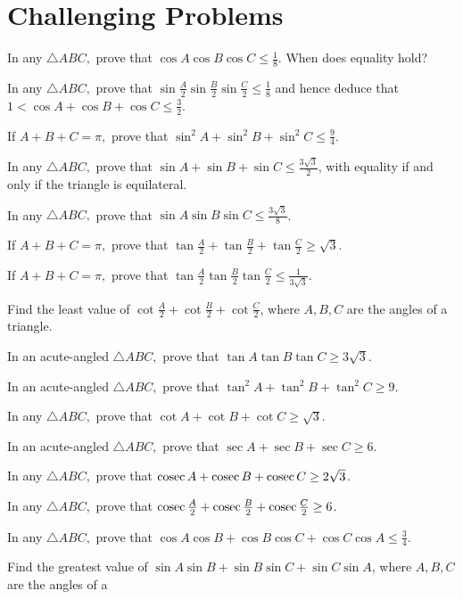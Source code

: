 \section{Challenging Problems}
\startitemize[n, 1*broad]
\item In any $\triangle ABC,$ prove that $\cos A\cos B\cos C \leq \frac{1}{8}$. When does equality hold?
\item In any $\triangle ABC,$ prove that $\sin\frac{A}{2}\sin\frac{B}{2}\sin\frac{C}{2} \leq \frac{1}{8}$ and hence
  deduce that $1 < \cos A + \cos B + \cos C \leq \frac{3}{2}$.
\item If $A + B + C = \pi,$ prove that $\sin^2A + \sin^2B + \sin^2C \leq \frac{9}{4}$.
\item In any $\triangle ABC,$ prove that $\sin A + \sin B + \sin C \leq \frac{3\sqrt{3}}{2}$, with equality if and only
  if the triangle is equilateral.
\item In any $\triangle ABC,$ prove that $\sin A\sin B\sin C \leq \frac{3\sqrt{3}}{8}$.
\item If $A + B + C = \pi,$ prove that $\tan\frac{A}{2} + \tan\frac{B}{2} + \tan\frac{C}{2} \geq \sqrt{3}$.
\item If $A + B + C = \pi,$ prove that $\tan\frac{A}{2}\tan\frac{B}{2}\tan\frac{C}{2} \leq \frac{1}{3\sqrt{3}}$.
\item Find the least value of $\cot\frac{A}{2} + \cot\frac{B}{2} + \cot\frac{C}{2}$, where $A, B, C$ are the angles of a
  triangle.
\item In an acute-angled $\triangle ABC,$ prove that $\tan A\tan B\tan C \geq 3\sqrt{3}$.
\item In an acute-angled $\triangle ABC,$ prove that $\tan^2A + \tan^2B + \tan^2C \geq 9$.
\item In any $\triangle ABC,$ prove that $\cot A + \cot B + \cot C \geq \sqrt{3}$.
\item In an acute-angled $\triangle ABC,$ prove that $\sec A + \sec B + \sec C \geq 6$.
\item In any $\triangle ABC,$ prove that ${\rm cosec}\,A + {\rm cosec}\,B + {\rm cosec}\,C \geq 2\sqrt{3}$.
\item In any $\triangle ABC,$ prove that ${\rm cosec}\,\frac{A}{2} + {\rm cosec}\,\frac{B}{2} + {\rm cosec}\,\frac{C}{2}
  \geq 6$.
\item In any $\triangle ABC,$ prove that $\cos A\cos B + \cos B\cos C + \cos C\cos A \leq \frac{3}{4}$.
\item Find the greatest value of $\sin A\sin B + \sin B\sin C + \sin C\sin A$, where $A, B, C$ are the angles of a

